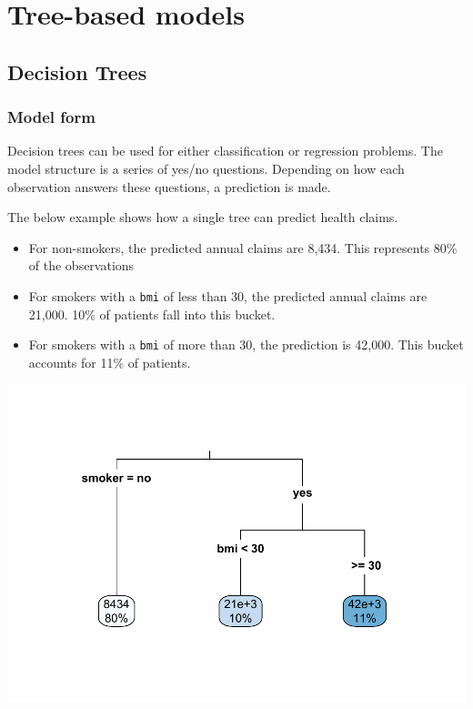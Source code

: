 \documentclass[openany]{book}
\providecommand{\tightlist}{%
  \setlength{\itemsep}{0pt}\setlength{\parskip}{0pt}}
\begin{document}
\hypertarget{tree-based-models}{%
\chapter{Tree-based models}\label{tree-based-models}}

\hypertarget{decision-trees}{%
\section{Decision Trees}\label{decision-trees}}

\hypertarget{model-form-1}{%
\subsection{Model form}\label{model-form-1}}

Decision trees can be used for either classification or regression problems. The model structure is a series of yes/no questions. Depending on how each observation answers these questions, a prediction is made.

The below example shows how a single tree can predict health claims.

\begin{itemize}
\tightlist
\item
  For non-smokers, the predicted annual claims are 8,434. This represents 80\% of the observations
\item
  For smokers with a \texttt{bmi} of less than 30, the predicted annual claims are 21,000. 10\% of patients fall into this bucket.
\item
  For smokers with a \texttt{bmi} of more than 30, the prediction is 42,000. This bucket accounts for 11\% of patients.
\end{itemize}

\includegraphics{06-tree-based-models_files/figure-latex/unnamed-chunk-2-1.pdf}
\end{document}
